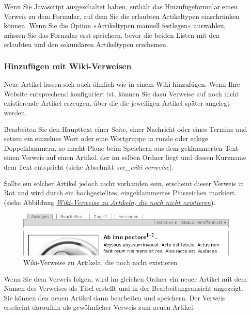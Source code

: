 \documentclass[a4paper,12pt,ngerman]{manual}
\begin{document}
Wenn Sie Javascript ausgeschaltet haben, enthält das Hinzufügeformular
einen Verweis zu dem Formular, auf dem Sie die erlaubten Artikeltypen
einschränken können. Wenn Sie die Option »Artikeltypen manuell
festlegen« auswählen, müssen Sie das Formular erst speichern, bevor
die beiden Listen mit den erlaubten und den sekundären Artikeltypen
erscheinen.
\hypertarget{sec-hinzufugen-mit-wiki}{}

\subsubsection{Hinzufügen mit Wiki-Verweisen}

Neue Artikel lassen sich auch ähnlich wie in einem Wiki
hinzufügen. Wenn Ihre Website entsprechend konfiguriert ist, können
Sie dazu Verweise auf noch nicht existierende Artikel erzeugen, über
die die jeweiligen Artikel später angelegt werden.

Bearbeiten Sie den Haupttext einer Seite, einer Nachricht oder eines Termins
und setzen ein einzelnes Wort oder eine Wortgruppe in runde oder eckige
Doppelklammern, so macht Plone beim Speichern aus dem geklammerten Text einen
Verweis auf einen Artikel, der im selben Ordner liegt und dessen Kurzname dem
Text entspricht (siehe Abschnitt \emph{sec\_wiki-verweise}).

Sollte ein solcher Artikel jedoch nicht vorhanden sein, erscheint dieser
Verweis in Rot und wird durch ein hochgestelltes, eingeklammertes Pluszeichen
markiert. (siehe Abbildung \hyperlink{fig-anzeige-wiki-links}{\emph{Wiki-Verweise zu Artikeln, die noch nicht existieren}}).
\hypertarget{fig-anzeige-wiki-links}{}\begin{figure}[htbp]
\centering

\includegraphics{anzeige-wiki-links.png}
\caption{Wiki-Verweise zu Artikeln, die noch nicht existieren}\end{figure}

Wenn Sie dem Verweis folgen, wird im gleichen Ordner ein neuer Artikel
mit dem Namen des Verweises als Titel erstellt und in der
Bearbeitungsansicht angezeigt. Sie können den neuen Artikel dann
bearbeiten und speichern. Der Verweis erscheint daraufhin als
gewöhnlicher Verweis zum neuen Artikel.
\end{document}
